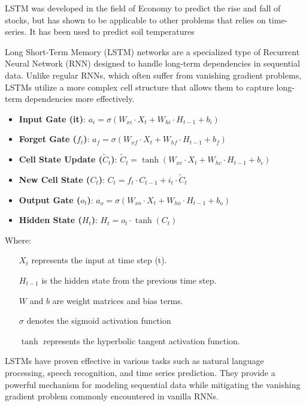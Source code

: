 LSTM\cite{hochreiter_long_1997} was developed in the field of Economy to predict the rise and fall of stocks, but has shown to be applicable to other problems that relies on time-series. It has been used to predict soil temperatures\cite{citakoglu_comparison_2017,elmaz_cnn-lstm_2021,feng_estimation_2019,kandasamy_performance_2023,li_attention-aware_2022,li_gans-lstm_2020,li_modeling_2020,wang_modeling_2022,mehdizadeh_modelling_2020}

Long Short-Term Memory (LSTM) networks are a specialized type of Recurrent Neural Network (RNN) designed to handle long-term dependencies in sequential data. Unlike regular RNNs, which often suffer from vanishing gradient problems, LSTMs utilize a more complex cell structure that allows them to capture long-term dependencies more effectively.

\begin{itemize}
	\item \textbf{Input Gate (it​)}:
	$ a_i = \sigma(W_{xi} \cdot X_t + W_{hi} \cdot H_{t-1} + b_i) $
	\item \textbf{Forget Gate ($f_t$)}:
	$ a_f = \sigma(W_{xf} \cdot X_t + W_{hf} \cdot H_{t-1} + b_f) $
	\item \textbf{Cell State Update ($\tilde{C}_t$)}:
	$ \tilde{C}_t = \tanh(W_{xc} \cdot X_t + W_{hc} \cdot H_{t-1} + b_c) $
	\item \textbf{New Cell State ($C_t$)}:
	$ C_t = f_t \cdot C_{t-1} + i_t \cdot \tilde{C}_t $
	\item \textbf{Output Gate ($o_t$)}:
	$ a_o = \sigma(W_{xo} \cdot X_t + W_{ho} \cdot H_{t-1} + b_o) $
	\item \textbf{Hidden State ($H_t$)}:
	$ H_t = o_t \cdot \tanh(C_t) $
\end{itemize}
Where:
\begin{itemize}
	\item[\(X_t\)] represents the input at time step (t).
	\item[\(H_{t-1}\)]  is the hidden state from the previous time step.
	\item[\(W\) and \(b\)]  are weight matrices and bias terms.
	\item[\(\sigma\)]  denotes the sigmoid activation function
	\item[\(\tanh\)]  represents the hyperbolic tangent activation function.
\end{itemize}

LSTMs have proven effective in various tasks such as natural language processing, speech recognition, and time series prediction. They provide a powerful mechanism for modeling sequential data while mitigating the vanishing gradient problem commonly encountered in vanilla RNNs.


